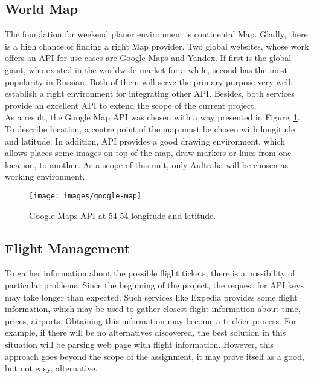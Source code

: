 \documentclass[12pt]{article}
\numberwithin{equation}{section} %
\numberwithin{figure}{section} %
\numberwithin{table}{section} %
\begin{document}
	\subsection{World Map}
		The foundation for weekend planer environment is continental Map. Gladly, there is a high chance of finding a right Map provider. Two global websites, whose work offers an API for use cases are Google Maps and Yandex. If first is the global giant, who existed in the worldwide market for a while, second has the most popularity in Russian. Both of them will serve the primary purpose very well: establish a right environment for integrating other API. Besides, both services provide an excellent API to extend the scope of the current project. \\
		
		As a result, the Google Map API was chosen with a way presented in Figure~\ref{fig:gmaps}. To describe location, a centre point of the map must be chosen with longitude and latitude. In addition, API provides a good drawing environment, which allows places some images on top of the map, draw markers or lines from one location, to another. As a scope of this unit, only Aultralia will be chosen as working environment.
		
		\begin{figure}[H]
			\centering        
			\texttt{[image: images/google-map]}
			\caption{Google Maps API at 54 54 longitude and latitude.}
			\label{fig:gmaps}
		\end{figure}	
	\subsection{Flight Management}
			
		
		To gather information about the possible flight tickets, there is a possibility of particular problems. Since the beginning of the project, the request for API keys may take longer than expected. Such services like Expedia provides some flight information, which may be used to gather closest flight information about time, prices, airports. Obtaining this information may become a trickier process. For example, if there will be no alternatives discovered, the best solution in this situation will be parsing web page with flight information. However, this approach goes beyond the scope of the assignment, it may prove itself as a good, but not easy, alternative.\\
\end{document}
